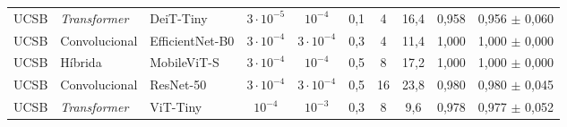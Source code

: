 \begin{table}[H]
{\begin{tabular}{lllccccccc}
UCSB & \textit{Transformer} & DeiT-Tiny & $3 \cdot 10^{-5}$ & $10^{-4}$ & 0{,}1 & 4 & 16{,}4 & 0{,}958 & 0{,}956 $\pm$ 0{,}060 \\
UCSB & Convolucional & EfficientNet-B0 & $3 \cdot 10^{-4}$ & $3 \cdot 10^{-4}$ & 0{,}3 & 4 & 11{,}4 & 1{,}000 & 1{,}000 $\pm$ 0{,}000 \\
UCSB & Híbrida & MobileViT-S & $3 \cdot 10^{-4}$ & $10^{-4}$ & 0{,}5 & 8 & 17{,}2 & 1{,}000 & 1{,}000 $\pm$ 0{,}000 \\
UCSB & Convolucional & ResNet-50 & $3 \cdot 10^{-4}$ & $3 \cdot 10^{-4}$ & 0{,}5 & 16 & 23{,}8 & 0{,}980 & 0{,}980 $\pm$ 0{,}045 \\
UCSB & \textit{Transformer} & ViT-Tiny & $10^{-4}$ & $10^{-3}$ & 0{,}3 & 8 & 9{,}6 & 0{,}978 & 0{,}977 $\pm$ 0{,}052 \\
\bottomrule
\end{tabular}%
}
\end{table}
